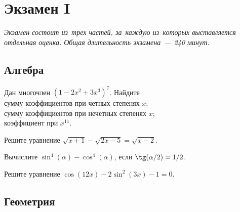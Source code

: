 
\section*{Экзамен I}



\emph{Экзамен состоит из~трех частей, за~каждую из~которых выставляется
отдельная оценка. Общая длительность экзамена~--- 240 минут.}

\subsection*{Алгебра}

\begin{problems}

Дан многочлен\enspace
$(1 - 2 x^2 + 3 x^3)^7$.
Найдите
\\
\subproblem
сумму коэффициентов при четных степенях $x$;
\\
\subproblem
сумму коэффициентов при нечетных степенях $x$;
\\
\subproblemx{*}
коэффициент при $x^{11}$.

Решите уравнение\enspace
$\sqrt{x + 1} - \sqrt{2 x - 5} = \sqrt{x - 2}$.

Вычислите\enspace
\(
        \sin^4(\alpha) - \cos^4(\alpha)
\),\enspace
если $\tg(\alpha / 2) = 1 / 2$.

Решите уравнение\enspace
$\cos(12 x) - 2 \sin^2(3 x) - 1 = 0$.

\end{problems}


\subsection*{Геометрия}

